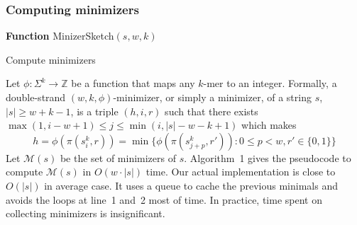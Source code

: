 \documentclass{bioinfo}
\begin{document}
\begin{methods}

\subsubsection{Computing minimizers}

\begin{algorithm}[ht]
\DontPrintSemicolon
\footnotesize
{}
\BlankLine
\textbf{Function} {\sc MinizerSketch}$(s,w,k)$
\caption{Compute minimizers}
\end{algorithm}

Let $\phi:\Sigma^k\to\mathbb{Z}$ be a function that maps any $k$-mer to an integer.
Formally, a double-strand $(w,k,\phi)$-minimizer, or simply a minimizer, of a
string $s$, $|s|\ge w+k-1$, is a triple $(h,i,r)$ such that there exists
$\max(1,i-w+1)\le j\le\min(i,|s|-w-k+1)$ which makes
$$
h=\phi(\pi(s_i^k,r))=\min\big\{\phi(\pi(s_{j+p}^k,r')):0\le p<w,r'\in\{0,1\}\big\}
$$
Let $\mathcal{M}(s)$ be the set of minimizers of $s$.  Algorithm~1 gives the
pseudocode to compute $\mathcal{M}(s)$ in $O(w\cdot|s|)$ time.  Our actual
implementation is close to $O(|s|)$ in average case. It uses a queue to cache
the previous minimals and avoids the loops at line~1 and~2 most of time. In
practice, time spent on collecting minimizers is insignificant.


\end{methods}
\end{document}
